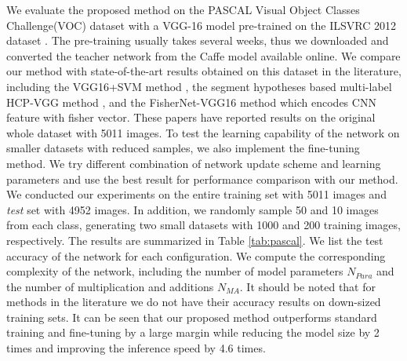\documentclass[journal]{IEEEtran}
\begin{document}
We evaluate the proposed method on the PASCAL Visual Object Classes Challenge(VOC) dataset \cite{everingham2010pascal} with a VGG-16 model \cite{simonyan2014very} pre-trained on the ILSVRC 2012 dataset \cite{ILSVRC15}. The pre-training usually takes several weeks, thus we downloaded and converted the teacher network from the Caffe model available online. We compare our method with state-of-the-art results obtained on this dataset in the literature, 
including the VGG16+SVM method \cite{simonyan2014very},
the segment hypotheses based multi-label HCP-VGG method \cite{wei2016hcp}, and the 
FisherNet-VGG16 method \cite{tang2016deep} which encodes CNN feature with fisher vector. 
These papers have reported results on the original whole dataset with 5011 images.
To test the learning capability of the network on smaller datasets with reduced samples, we also implement the fine-tuning method. We try different combination of network update scheme and learning parameters and use the best result for performance comparison with our method. 
We conducted our experiments on the entire training set with 5011 images and \textit{test} set with 4952 images. In addition, we randomly sample 50 and 10 images from each class, generating two small datasets with 1000 and 200 training images, respectively. 
The results are summarized in Table \ref{tab:pascal}.   We list the test accuracy of the network for each configuration.
We compute the corresponding complexity of the network, including the number of model parameters $N_{Para}$ and the number of multiplication and additions $N_{MA}$.
It should be noted that for methods in the literature we do not have  their accuracy results on down-sized training sets.
It can be seen that our proposed method outperforms standard training and fine-tuning by a large margin while reducing the model size by 2 times and improving the inference speed by 4.6 times.
\end{document}
